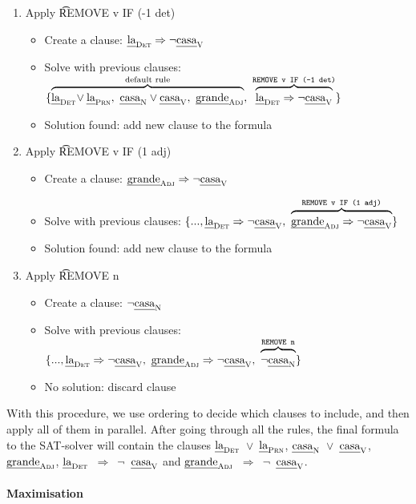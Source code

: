 \begin{enumerate}
\item Apply \t{REMOVE v IF (-1 det)}
 \begin{itemize}
    \item Create a clause: $\text{\em la}_{\text{\sc Det}} \Rightarrow \neg \text{\em casa}_{\text{\sc V}}$
    \item Solve with previous clauses:
  $\{ \ob{\laDet \! \vee \laPrn, \ \casaN \vee \casaV, \  \grandeAdj}^{\text{default rule}}, \ 
      \ob{\laDet \Rightarrow \neg \casaV}^{\t{REMOVE v IF (-1 det)}} \}$
    \item Solution found: add new clause to the formula
 \end{itemize}
\item Apply \t{REMOVE v IF (1 adj)} 
 \begin{itemize}
    \item Create a clause: $\text{\em grande}_{\text{\sc Adj}} \Rightarrow \neg \text{\em casa}_{\text{\sc V}}$
    \item Solve with previous clauses:
  $\{..., \laDet \Rightarrow \neg \casaV, \ 
      \ob{\grandeAdj \Rightarrow \neg \casaV}^{\t{REMOVE v IF (1 adj)}}  \}$
    \item Solution found: add new clause to the formula
 \end{itemize}
\item Apply \t{REMOVE n}
 \begin{itemize}
    \item Create a clause: $\neg \text{\em casa}_{\text{\sc N}}$
    \item Solve with previous clauses:
      $\{ ..., \laDet \Rightarrow \neg \casaV, \ 
      \grandeAdj \Rightarrow \neg \casaV, \ 
      \ob{\neg \casaN}^{\t{REMOVE n}} \}$
    \item No solution: discard clause
 \end{itemize}

\end{enumerate}

With this procedure, we use ordering to decide which clauses to include, and
then apply all of them in parallel.
After going through all the rules, the final formula to the SAT-solver will contain the clauses  
$\text{\em la}_{\text{\sc Det}}$~$\vee$~$\text{\em la}_{\text{\sc Prn}}$, $\text{\em casa}_{\text{\sc N}}$~$\vee$~$\text{\em casa}_{\text{\sc V}}$,  $\text{\em grande}_{\text{\sc Adj}}$, $\text{\em la}_{\text{\sc Det}}$~$\Rightarrow$~$\neg$~$\text{\em casa}_{\text{\sc V}}$ and $\text{\em grande}_{\text{\sc Adj}}$~$\Rightarrow$~$\neg$~$\text{\em casa}_{\text{\sc V}}$.


\paragraph{Maximisation} 

